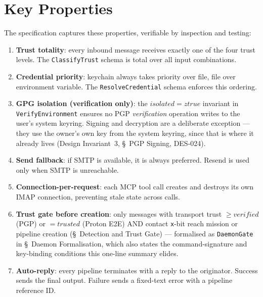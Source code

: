 \documentclass[a4paper,10pt,fleqn]{article}
\begin{document}
\section{Key Properties}

The specification captures these properties, verifiable by
inspection and testing:

\begin{enumerate}
  \item \textbf{Trust totality}: every inbound message receives
    exactly one of the four trust levels.  The
    \texttt{ClassifyTrust} schema is total over all input
    combinations.

  \item \textbf{Credential priority}: keychain always takes
    priority over file, file over environment variable.  The
    \texttt{ResolveCredential} schema enforces this ordering.

  \item \textbf{GPG isolation (verification only)}: the $isolated =
    ztrue$ invariant in \texttt{VerifyEnvironment} ensures no PGP
    \emph{verification} operation writes to the user's system
    keyring.  Signing and decryption are a deliberate exception ---
    they use the owner's own key from the system keyring, since that
    is where it already lives (Design Invariant~3, \S~PGP Signing,
    DES-024).

  \item \textbf{Send fallback}: if SMTP is available, it is
    always preferred.  Resend is used only when SMTP is
    unreachable.

  \item \textbf{Connection-per-request}: each MCP tool call
    creates and destroys its own IMAP connection, preventing
    stale state across calls.

  \item \textbf{Trust gate before creation}: only messages with
    transport trust $\geq verified$ (PGP) or $= trusted$ (Proton E2E)
    AND contact \texttt{x}-bit reach mission or pipeline creation
    (\S~Detection and Trust Gate) --- formalised as
    \texttt{DaemonGate} in \S~Daemon Formalisation, which also states
    the command-signature and key-binding conditions this one-line
    summary elides.

  \item \textbf{Auto-reply}: every pipeline terminates with a reply
    to the originator.  Success sends the final output.  Failure
    sends a fixed-text error with a pipeline reference ID.


\end{enumerate}
\end{document}
